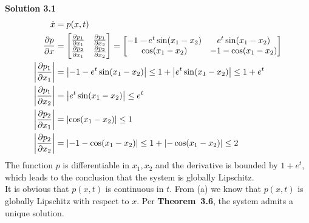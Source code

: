 \documentclass[fleqn, 10.5pt, a4paper]{article}
\theoremstyle{definition}
\numberwithin{equation}{section}
\newenvironment{mymat}{\left[\begin{matrix}}{\end{matrix}\right]}
\newcommand{\abs}[1]{\left|#1\right|}
\begin{document}
\noindent \textbf {Solution 3.1} \\
\begin{align*}
	\dot{x} &= p(x,t) \\
	\frac{\partial p}{\partial x} &=  \begin{mymat}\frac{\partial p_1}{\partial x_1} & \frac{\partial p_1}{\partial x_2} \\
	\frac{\partial p_2}{\partial x_1} & \frac{\partial p_2}{\partial x_2}
	\end{mymat} = \begin{mymat}
	-1 - e^t \sin(x_1-x_2) & e^t \sin (x_1-x_2) \\
	\cos(x_1-x_2) & -1-\cos(x_1-x_2)
	\end{mymat} \\
	\abs{\frac{\partial p_1}{\partial x_1}} &=  \abs{-1 - e^t \sin(x_1-x_2)} \leq 1+\abs{e^t \sin(x_1-x_2)} \leq 1+e^t\\
	\abs{\frac{\partial p_1}{\partial x_2}} &= \abs{e^t \sin (x_1-x_2)} \leq e^t\\
	\abs{\frac{\partial p_2}{\partial x_1}} &= \abs{\cos(x_1-x_2)} \leq 1\\
	\abs{\frac{\partial p_2}{\partial x_2}} &=\abs{-1-\cos(x_1-x_2)}\leq 1 + \abs{-\cos(x_1-x_2)} \leq 2\\
\end{align*}
The function $p$ is differentiable in $x_1,x_2$ and the derivative is bounded by $1+e^t$, which leads to the conclusion that the system is globally Lipschitz. \\
It is obvious that $p(x,t)$ is continuous in $t$. From (a) we know that $p(x,t)$ is globally Lipschitz with respect to $x$. Per \textbf{Theorem~{3.6}}, the system admits a unique solution.
\end{document}
